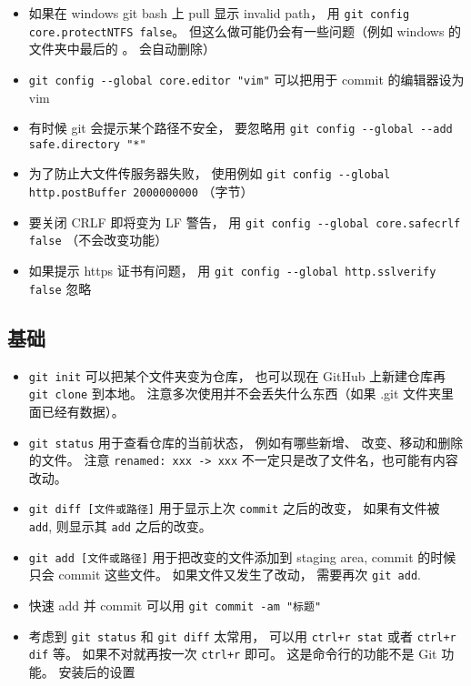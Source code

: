\begin{itemize}
\item 如果在 windows git bash 上 pull 显示 invalid path， 用 \verb|git config core.protectNTFS false|。 但这么做可能仍会有一些问题（例如 windows 的文件夹中最后的 。 会自动删除）
\item \verb|git config --global core.editor "vim"| 可以把用于 commit 的编辑器设为 vim
\item 有时候 git 会提示某个路径不安全， 要忽略用 \verb|git config --global --add safe.directory "*"|
\item 为了防止大文件传服务器失败， 使用例如 \verb|git config --global http.postBuffer 2000000000| （字节）
\item 要关闭 CRLF 即将变为 LF 警告， 用 \verb|git config --global core.safecrlf false| （不会改变功能）
\item 如果提示 https 证书有问题， 用 \verb|git config --global http.sslverify false| 忽略
\end{itemize}

\subsection{基础}
\begin{itemize}
\item \verb|git init| 可以把某个文件夹变为仓库， 也可以现在 GitHub 上新建仓库再 \verb|git clone| 到本地。 注意多次使用并不会丢失什么东西（如果 .git 文件夹里面已经有数据）。
\item \verb|git status| 用于查看仓库的当前状态， 例如有哪些新增、 改变、移动和删除的文件。 注意 \verb|renamed: xxx -> xxx| 不一定只是改了文件名，也可能有内容改动。
\item \verb|git diff [文件或路径]| 用于显示上次 \verb|commit| 之后的改变， 如果有文件被 \verb|add|, 则显示其 \verb|add| 之后的改变。
\item \verb|git add [文件或路径]| 用于把改变的文件添加到 staging area, commit 的时候只会 commit 这些文件。 如果文件又发生了改动， 需要再次 \verb|git add|.
\item 快速 add 并 commit 可以用 \verb|git commit -am "标题"|
\item 考虑到 \verb|git status| 和 \verb|git diff| 太常用， 可以用 \verb|ctrl+r stat| 或者 \verb|ctrl+r dif| 等。 如果不对就再按一次 \verb|ctrl+r| 即可。 这是命令行的功能不是 Git 功能。
安装后的设置
\end{itemize}


